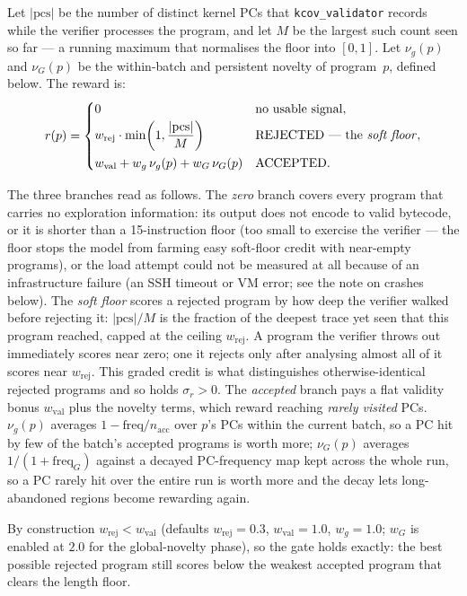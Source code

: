 Let $|\mathrm{pcs}|$ be the number of distinct kernel PCs that
\texttt{kcov\_validator} records while the verifier processes the program, and let
$M$ be the largest such count seen so far --- a running maximum that normalises the
floor into $[0,1]$. Let $\nu_g(p)$ and $\nu_G(p)$ be the within-batch and
persistent novelty of program~$p$, defined below. The reward is:
\begin{equation}
  r(p) =
  \begin{cases}
    0 & \text{no usable signal},\\[2pt]
    w_{\mathrm{rej}} \cdot \min\!\left(1, \dfrac{|\mathrm{pcs}|}{M}\right)
      & \text{REJECTED --- the \emph{soft floor}},\\[8pt]
    w_{\mathrm{val}} + w_{g}\,\nu_g(p) + w_{G}\,\nu_G(p)
      & \text{ACCEPTED}.
  \end{cases}
  \label{eq:reward-v2}
\end{equation}

The three branches read as follows.
The \emph{zero} branch covers every program that carries no exploration
information: its output does not encode to valid bytecode, or it is shorter than a
15-instruction floor (too small to exercise the verifier --- the floor stops the
model from farming easy soft-floor credit with near-empty programs), or the load
attempt could not be measured at all because of an infrastructure failure (an SSH
timeout or VM error; see the note on crashes below).
The \emph{soft floor} scores a rejected program by how deep the verifier walked
before rejecting it: $|\mathrm{pcs}|/M$ is the fraction of the deepest trace yet
seen that this program reached, capped at the ceiling $w_{\mathrm{rej}}$. A program
the verifier throws out immediately scores near zero; one it rejects only after
analysing almost all of it scores near $w_{\mathrm{rej}}$. This graded credit is
what distinguishes otherwise-identical rejected programs and so holds
$\sigma_r > 0$.
The \emph{accepted} branch pays a flat validity bonus $w_{\mathrm{val}}$ plus the
novelty terms, which reward reaching \emph{rarely visited} PCs.
$\nu_g(p)$ averages $1-\mathrm{freq}/n_{\mathrm{acc}}$ over $p$'s PCs within the
current batch, so a PC hit by few of the batch's accepted programs is worth more;
$\nu_G(p)$ averages $1/(1+\mathrm{freq}_{G})$ against a decayed PC-frequency map
kept across the whole run, so a PC rarely hit over the entire run is worth more and
the decay lets long-abandoned regions become rewarding again.

By construction $w_{\mathrm{rej}} < w_{\mathrm{val}}$ (defaults
$w_{\mathrm{rej}}=0.3$, $w_{\mathrm{val}}=1.0$, $w_g=1.0$; $w_G$ is enabled at
$2.0$ for the global-novelty phase), so the gate holds exactly: the best possible
rejected program still scores below the weakest accepted program that clears the
length floor.

